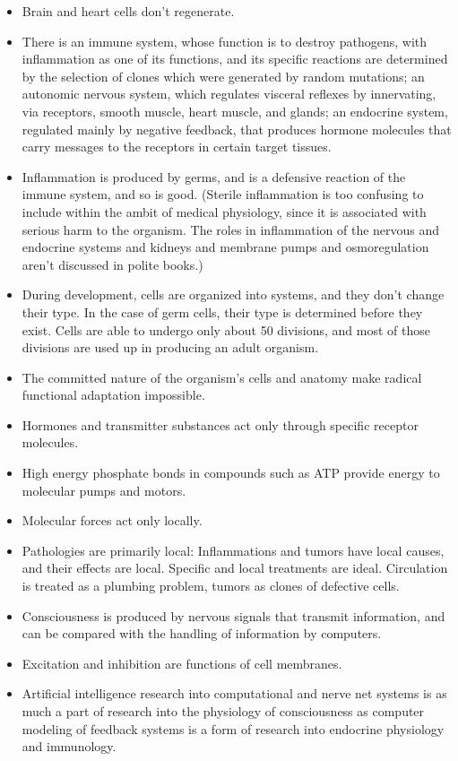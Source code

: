 \documentclass{article}
\begin{document}
\begin{itemize}
    \item Brain and heart cells don’t regenerate.
    \item There is an immune system, whose function is to destroy pathogens, with inflammation as one of its functions, and its specific reactions are determined by the selection of clones which were generated by random mutations; an autonomic nervous system, which regulates visceral reflexes by innervating, via receptors, smooth muscle, heart muscle, and glands; an endocrine system, regulated mainly by negative feedback, that produces hormone molecules that carry messages to the receptors in certain target tissues.
    \item Inflammation is produced by germs, and is a defensive reaction of the immune system, and so is good. (Sterile inflammation is too confusing to include within the ambit of medical physiology, since it is associated with serious harm to the organism. The roles in inflammation of the nervous and endocrine systems and kidneys and membrane pumps and osmoregulation aren’t discussed in polite books.)
    \item During development, cells are organized into systems, and they don’t change their type. In the case of germ cells, their type is determined before they exist. Cells are able to undergo only about 50 divisions, and most of those divisions are used up in producing an adult organism.
    \item The committed nature of the organism’s cells and anatomy make radical functional adaptation impossible.
    \item Hormones and transmitter substances act only through specific receptor molecules.
    \item High energy phosphate bonds in compounds such as ATP provide energy to molecular pumps and motors.
    \item Molecular forces act only locally.
    \item Pathologies are primarily local: Inflammations and tumors have local causes, and their effects are local. Specific and local treatments are ideal. Circulation is treated as a plumbing problem, tumors as clones of defective cells.
    \item Consciousness is produced by nervous signals that transmit information, and can be compared with the handling of information by computers.
    \item Excitation and inhibition are functions of cell membranes.
    \item Artificial intelligence research into computational and nerve net systems is as much a part of research into the physiology of consciousness as computer modeling of feedback systems is a form of research into endocrine physiology and immunology.

\end{itemize}
\end{document}
